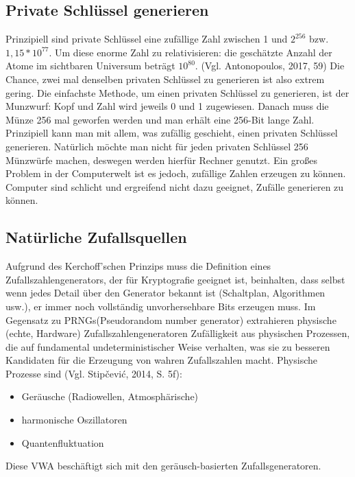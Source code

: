 \subsection{Private Schlüssel generieren}
Prinzipiell sind private Schlüssel eine zufällige Zahl zwischen 1 und \( 2^{256} \) bzw. \( 1,15 * 10^{77} \). Um diese enorme Zahl
zu relativisieren: die geschätzte Anzahl der Atome im sichtbaren Universum beträgt \( 10^{80} \). (Vgl. Antonopoulos, 2017, 59) Die Chance,
zwei mal denselben privaten Schlüssel zu generieren ist also extrem gering. Die einfachste Methode, um einen privaten Schlüssel
zu generieren, ist der Munzwurf: Kopf und Zahl wird jeweils 0 und 1 zugewiesen. Danach muss die Münze 256 mal geworfen werden
und man erhält eine 256-Bit lange Zahl. Prinzipiell kann man mit allem, was zufällig geschieht, einen privaten Schlüssel generieren.
Natürlich möchte man nicht für jeden privaten Schlüssel 256 Münzwürfe machen, deswegen werden hierfür Rechner genutzt. Ein großes
Problem in der Computerwelt ist es jedoch, zufällige Zahlen erzeugen zu können. Computer sind schlicht und ergreifend nicht dazu 
geeignet, Zufälle generieren zu können.

\subsection{Natürliche Zufallsquellen}
Aufgrund des Kerchoff'schen Prinzips muss die Definition eines Zufallszahlengenerators, der für Kryptografie geeignet ist, beinhalten, 
dass selbst wenn jedes Detail über den Generator bekannt ist (Schaltplan, Algorithmen usw.), er immer noch vollständig unvorhersehbare 
Bits erzeugen muss. Im Gegensatz zu PRNGs(Pseudorandom number generator) extrahieren physische (echte, Hardware) Zufallszahlengeneratoren 
Zufälligkeit aus physischen Prozessen, die auf fundamental undeterministischer Weise verhalten, was sie zu besseren Kandidaten für die 
Erzeugung von wahren Zufallszahlen macht. Physische Prozesse sind (Vgl. Stipčević, 2014, S. 5f):
\begin{itemize}
    \item Geräusche (Radiowellen, Atmosphärische)
    \item harmonische Oszillatoren
    \item Quantenfluktuation
  \end{itemize}
Diese VWA beschäftigt sich mit den geräusch-basierten Zufallsgeneratoren.

